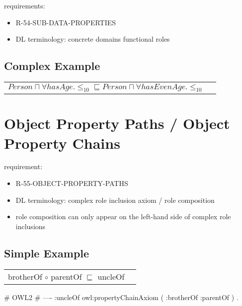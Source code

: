 \documentclass{llncs}
\newenvironment{DL}{
	\begin{center}
  \begin{tabular}{r l}

}{
  \end{tabular}
	\end{center}
}
\begin{document}
requirements:

\begin{itemize}

	\item R-54-SUB-DATA-PROPERTIES
\end{itemize}



\begin{itemize}
	\item DL terminology: concrete domains functional roles  
\end{itemize}

\subsection{Complex Example}
\begin{DL}
 $Person \sqcap  \forall hasAge. \leq_{10} \sqsubseteq Person \sqcap \forall hasEvenAge. \leq_{10}$ 
\end{DL}

\section{Object Property Paths / Object Property Chains}

requirement:

\begin{itemize}
	\item R-55-OBJECT-PROPERTY-PATHS
\end{itemize}



\begin{itemize}
  \item DL terminology: complex role inclusion axiom / role composition
	\item role composition can only appear on the left-hand side of complex role inclusions \cite{Kroetzsch2012}
\end{itemize}

\subsection{Simple Example}

\begin{DL}
brotherOf $\circ$ parentOf $\sqsubseteq$ uncleOf 
\end{DL}

\begin{ex}
# OWL2
# ----
:uncleOf owl:propertyChainAxiom ( :brotherOf :parentOf ) . 
\end{ex}
\end{document}
